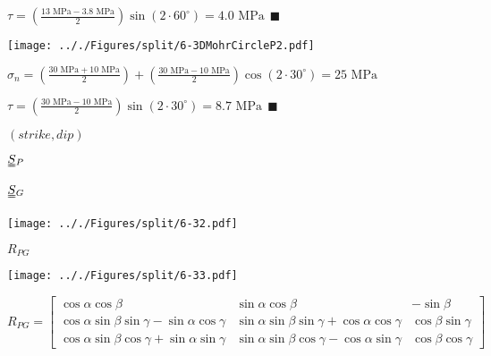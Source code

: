 \documentclass[onecolumn,11pt]{report}
\def\lthtmlcheckvsize{\ifdim\ht\sizebox<\vsize 
  \ifdim\wd\sizebox<\hsize\expandafter\hfill\fi \expandafter\vfill
  \else\expandafter\vss\fi}%
\begin{document}
{\newpage\clearpage
{}%
$\displaystyle \tau = \left( \frac{13 \text{ MPa} - 3.8 \text{ MPa}}{2} \right) \sin(2 \cdot 60^{\circ}) = 4.0 \text{ MPa} 
	\: \: \blacksquare
$%
\lthtmlindisplaymathZ
\lthtmlcheckvsize\clearpage}

{\newpage\clearpage
{}%
\texttt{[image: .././Figures/split/6-3DMohrCircleP2.pdf]}%
\lthtmlpictureZ
\lthtmlcheckvsize\clearpage}

{\newpage\clearpage
{}%
$\displaystyle \sigma_n = \left( \frac{30 \text{ MPa} + 10 \text{ MPa}}{2} \right) + \left( \frac{30 \text{ MPa} - 10 \text{ MPa}}{2} \right) \cos(2 \cdot 30^{\circ}) = 25 \text{ MPa}
$%
\lthtmlindisplaymathZ
\lthtmlcheckvsize\clearpage}

{\newpage\clearpage
{}%
$\displaystyle \tau = \left( \frac{30 \text{ MPa} - 10 \text{ MPa}}{2} \right) \sin(2 \cdot 30^{\circ}) = 8.7 \text{ MPa} 
	\: \: \blacksquare
$%
\lthtmlindisplaymathZ
\lthtmlcheckvsize\clearpage}

{\newpage\clearpage
{}%
$ (strike,dip)$%
\lthtmlindisplaymathZ
\lthtmlcheckvsize\clearpage}

{\newpage\clearpage
{}%
$ \uuline{S}{}_P$%
\lthtmlindisplaymathZ
\lthtmlcheckvsize\clearpage}

{\newpage\clearpage
{}%
$ \uuline{S}{}_G$%
\lthtmlindisplaymathZ
\lthtmlcheckvsize\clearpage}

{\newpage\clearpage
{}%
\texttt{[image: .././Figures/split/6-32.pdf]}%
\lthtmlpictureZ
\lthtmlcheckvsize\clearpage}

{\newpage\clearpage
{}%
$ R_{PG}$%
\lthtmlindisplaymathZ
\lthtmlcheckvsize\clearpage}

{\newpage\clearpage
{}%
\texttt{[image: .././Figures/split/6-33.pdf]}%
\lthtmlpictureZ
\lthtmlcheckvsize\clearpage}

{\newpage\clearpage
{}%
\begin{displaymath}R_{PG}
=
\left[
\begin{array}{ccc}
\cos \alpha \cos \beta & \sin \alpha \cos \beta  & -\sin \beta \\
\cos \alpha \sin \beta \sin \gamma - \sin \alpha \cos \gamma  & \sin \alpha \sin \beta \sin \gamma + \cos \alpha \cos \gamma  & \cos \beta \sin \gamma \\
\cos \alpha \sin \beta \cos \gamma + \sin \alpha \sin \gamma  & \sin \alpha \sin \beta \cos \gamma - \cos \alpha \sin \gamma  & \cos \beta \cos \gamma
\end{array}
\right]\end{displaymath}%
\lthtmldisplayZ
\lthtmlcheckvsize\clearpage}
\end{document}
